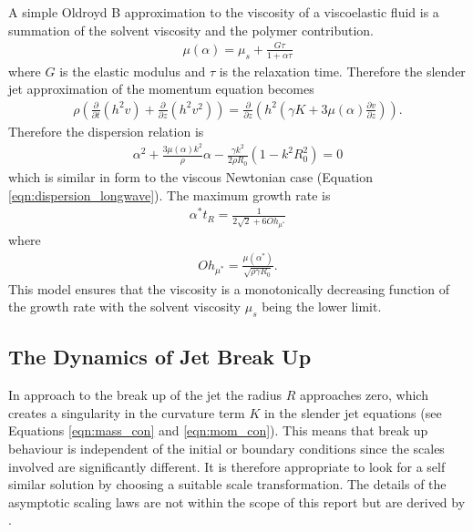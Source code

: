 \documentclass[11pt]{article}
\newcommand{\pd}[2]{\frac{\partial #1}{\partial #2}}
\begin{document}
A simple Oldroyd B approximation to the viscosity of a viscoelastic fluid is a 
summation of the solvent viscosity and the polymer contribution. 
\begin{align}
\mu(\alpha) = \mu_s + \frac{G \tau}{1 + \alpha \tau}
\end{align}
where $G$ is the elastic modulus and $\tau$  is the relaxation time. Therefore 
the slender jet approximation of the momentum equation becomes
\begin{align*}
\rho \left( \pd{}{t} (h^2v) + \pd{}{z} (h^2v^2) \right) = \pd{}{z} \left(h^2 
\left( \gamma K + 3 \mu(\alpha) \pd{v}{z}\right) \right).
\end{align*}
Therefore the dispersion relation is
\begin{align}
\alpha^2 + \frac{3 \mu(\alpha) k^2}{\rho}\alpha - \frac{\gamma k^2}{2 \rho 
R_0}(1 - k^2R_0^2) = 0
\label{eqn:dispersion_viscoelastic}
\end{align}
which is similar in form to the viscous Newtonian case (Equation 
\ref{eqn:dispersion_longwave}). The maximum growth rate is
\begin{align*}
\alpha^* t_R = \frac{1}{2 \sqrt{2} + 6 Oh_{\mu^*}}
\end{align*}
where
\begin{align*}
Oh_{\mu^*} = \frac{\mu(\alpha^*)}{\sqrt{\rho \gamma R_0}}.
\end{align*}
This model ensures that the viscosity is a monotonically decreasing function of 
the growth rate with the solvent viscosity $\mu_s$ being the lower limit. 

\subsection{The Dynamics of Jet Break Up}
In approach to the break up of the jet the radius $R$ approaches zero, which 
creates a singularity in the curvature term $K$ in the slender jet equations 
(see Equations \ref{eqn:mass_con} and \ref{eqn:mom_con}). This means that break 
up behaviour is independent of the initial or boundary conditions since the 
scales involved are significantly different. It is therefore appropriate to 
look for a self similar solution by choosing a suitable scale transformation. 
The details of the asymptotic scaling laws are not within the scope of this 
report but are derived by \cite{eggers2005drop}.
\end{document}
